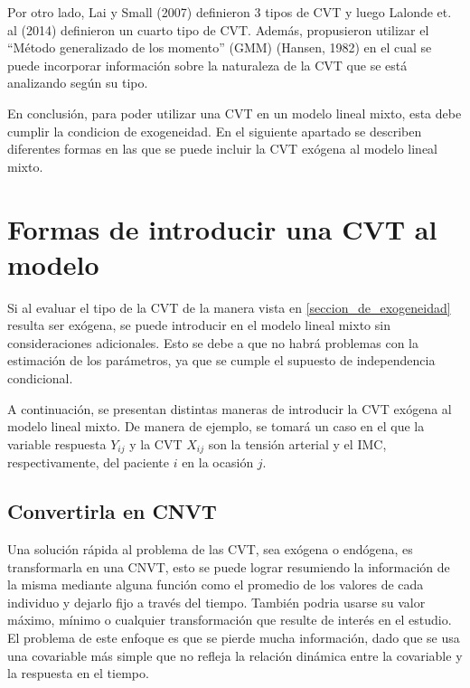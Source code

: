 \documentclass[spanish]{article}
\numberwithin{figure}{subsection}
\numberwithin{equation}{subsection}
\numberwithin{table}{subsection}
\begin{document}
Por otro lado, Lai y Small (2007) definieron 3 tipos de CVT y luego Lalonde et.
al (2014) definieron un cuarto tipo de CVT. Además, propusieron utilizar el
``Método generalizado de los momento'' (GMM) (Hansen, 1982) en el cual se puede
incorporar información sobre la naturaleza de la CVT que se está analizando
según su tipo.

En conclusión, para poder utilizar una CVT en un modelo lineal mixto, esta debe
cumplir la condicion de exogeneidad. En el siguiente apartado se describen
diferentes formas en las que se puede incluir la CVT exógena al modelo lineal
mixto.

\newpage


\section{Formas de introducir una CVT al modelo}

Si al evaluar el tipo de la CVT de la manera vista en
\ref{seccion_de_exogeneidad} resulta ser exógena, se puede introducir en el
modelo lineal mixto sin consideraciones adicionales. Esto se debe a que no habrá
problemas con la estimación de los parámetros, ya que se cumple el supuesto de
independencia condicional.

A continuación, se presentan distintas maneras de introducir la CVT exógena al
modelo lineal mixto. De manera de ejemplo, se tomará un caso en el que la variable
respuesta $Y_{ij}$ y la CVT $X_{ij}$ son la tensión arterial y el IMC,
respectivamente, del paciente $i$ en la ocasión $j$.

\subsection{Convertirla en CNVT}

Una solución rápida al problema de las CVT, sea exógena o endógena, es
transformarla en una CNVT, esto se puede lograr resumiendo la información de la
misma mediante alguna función como el promedio de los valores de cada individuo
y dejarlo fijo a través del tiempo. También podria usarse su valor máximo,
mínimo o cualquier transformación que resulte de interés en el estudio. El
problema de este enfoque es que se pierde mucha información, dado que se usa una
covariable más simple que no refleja la relación dinámica entre la covariable y
la respuesta en el tiempo.
\end{document}
